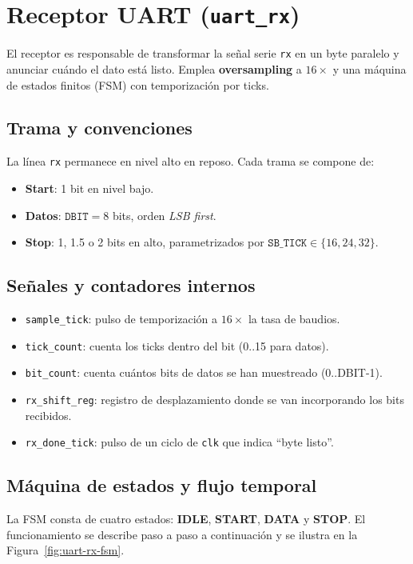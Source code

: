 \section{Receptor UART (\texttt{uart\_rx})}

El receptor es responsable de transformar la señal serie \texttt{rx} en un byte paralelo y anunciar cuándo el dato está listo. Emplea \textbf{oversampling} a $16\times$ y una máquina de estados finitos (FSM) con temporización por ticks.

\subsection{Trama y convenciones}
La línea \texttt{rx} permanece en nivel alto en reposo. Cada trama se compone de:
\begin{itemize}
    \item \textbf{Start}: 1 bit en nivel bajo.
    \item \textbf{Datos}: \(\texttt{DBIT}=8\) bits, orden \textit{LSB first}.
    \item \textbf{Stop}: 1, 1.5 o 2 bits en alto, parametrizados por \(\texttt{SB\_TICK}\in\{16,24,32\}\).
\end{itemize}

\subsection{Señales y contadores internos}
\begin{itemize}
    \item \texttt{sample\_tick}: pulso de temporización a \(16\times\) la tasa de baudios.
    \item \texttt{tick\_count}: cuenta los ticks dentro del bit (0..15 para datos).
    \item \texttt{bit\_count}: cuenta cuántos bits de datos se han muestreado (0..DBIT-1).
    \item \texttt{rx\_shift\_reg}: registro de desplazamiento donde se van incorporando los bits recibidos.
    \item \texttt{rx\_done\_tick}: pulso de un ciclo de \texttt{clk} que indica “byte listo”.
\end{itemize}

\subsection{Máquina de estados y flujo temporal}
La FSM consta de cuatro estados: \textbf{IDLE}, \textbf{START}, \textbf{DATA} y \textbf{STOP}. El funcionamiento se describe paso a paso a continuación y se ilustra en la Figura~\ref{fig:uart-rx-fsm}.

